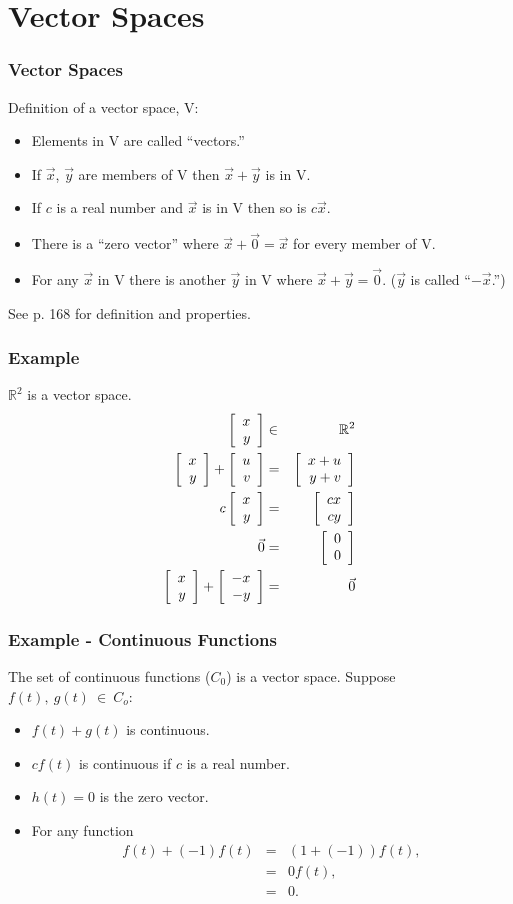 \section{Vector Spaces}

\begin{frame}
  \frametitle{Vector Spaces}

  Definition of a vector space, V:
  \begin{itemize}
  \item Elements in V are called ``vectors.''
  \item If $\vec{x}$, $\vec{y}$ are members of V then
    $\vec{x}+\vec{y}$ is in V.
  \item If $c$ is a real number and $\vec{x}$ is in V then so is
    $c\vec{x}$.
  \item There is a ``zero vector'' where $\vec{x}+\vec{0}=\vec{x}$ for
    every member of V.
  \item For any $\vec{x}$ in V there is another $\vec{y}$ in V where
    $\vec{x}+\vec{y}=\vec{0}$. ($\vec{y}$ is called ``$-\vec{x}$.'')
  \end{itemize}

  See p. 168 for definition and properties.

\end{frame}

\begin{frame}
  \frametitle{Example}

  $\mathbb{R}^2$ is a vector space.
  \begin{eqnarray*}
    \left[ \begin{array}{r} x \\ y \end{array} \right] & \in & \mathbb{R}^2 \\
    \left[ \begin{array}{r} x \\ y \end{array} \right] + \left[ \begin{array}{r} u \\ v \end{array} \right] & = & \left[ \begin{array}{r} x+u \\ y+v \end{array} \right] \\
    c \left[ \begin{array}{r} x \\ y \end{array} \right] & = & \left[ \begin{array}{r} cx \\ cy \end{array} \right] \\
    \vec{0} & = & \left[ \begin{array}{r} 0 \\ 0 \end{array} \right] \\
    \left[ \begin{array}{r} x \\ y \end{array} \right] + \left[ \begin{array}{r} -x \\ -y \end{array} \right] & = & \vec{0}
  \end{eqnarray*}

\end{frame}


\begin{frame}
  \frametitle{Example - Continuous Functions}

  The set of continuous functions ($C_0$) is a vector space.
  Suppose $f(t),~g(t)~\in~C_o$:
  \begin{itemize}
  \item $f(t)+g(t)$ is continuous.
  \item $c f(t)$ is continuous if $c$ is a real number.
  \item $h(t)=0$ is the zero vector.
  \item For any function
    \begin{eqnarray*}
      f(t) + (-1)f(t) & = & (1 + (-1))f(t), \\
      & = & 0 f(t), \\
      & = & 0.
    \end{eqnarray*}
  \end{itemize}

\end{frame}


